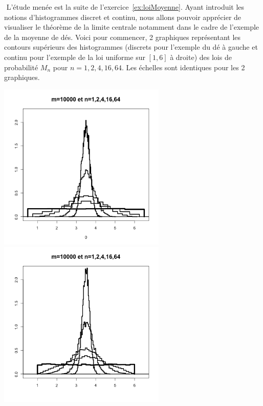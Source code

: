 \documentclass[10pt]{report}
\begin{document}
\begin{exercice} ${ }$ \label{ex:histMoyenne}
L'étude menée est la suite de l'exercice~\ref{ex:loiMoyenne}. Ayant introduit les notions d'histogrammes discret et continu, nous allons pouvoir apprécier de visualiser le théorème de la limite centrale notamment dans le cadre de l'exemple de la moyenne de dés. Voici pour commencer, 2 graphiques représentant les contours supérieurs des histogrammes (discrets pour l'exemple du dé à gauche et continu pour l'exemple de la loi uniforme sur $[1,6]$ à droite) des lois de probabilité $M_n$ pour $n=1,2,4,16,64$. Les échelles sont identiques pour les 2 graphiques.














































\centerline{\includegraphics[width=8cm,height=8cm]{img/moyDes}\includegraphics[width=8cm,height=8cm]{img/moyUnifs}}


\end{exercice}
\end{document}
